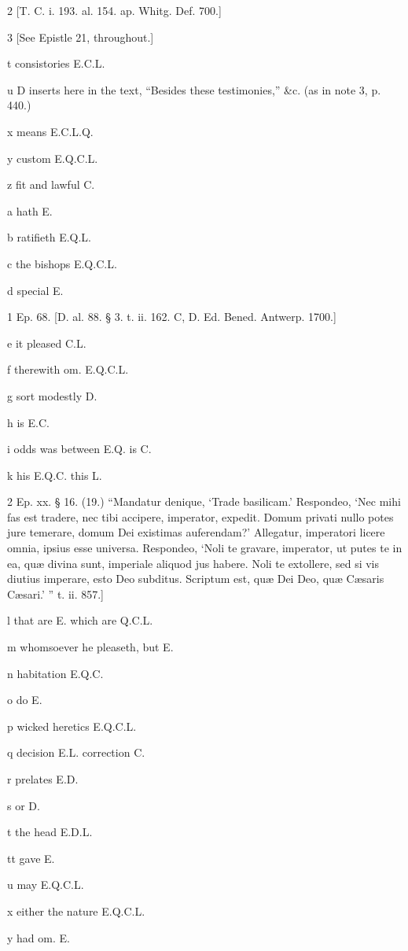 2
[T. C. i. 193. al. 154. ap. Whitg. Def. 700.]

3
[See Epistle 21, throughout.]

t
consistories E.C.L.

u
D inserts here in the text, “Besides these testimonies,” &c. (as in note 3, p. 440.)

x
means E.C.L.Q.

y
custom E.Q.C.L.

z
fit and lawful C.

a
hath E.

b
ratifieth E.Q.L.

c
the bishops E.Q.C.L.

d
special E.

1
Ep. 68. [D. al. 88. § 3. t. ii. 162. C, D. Ed. Bened. Antwerp. 1700.]

e
it pleased C.L.

f
therewith om. E.Q.C.L.

g
sort modestly D.

h
is E.C.

i
odds was between E.Q. is C.

k
his E.Q.C. this L.

2
Ep. xx. § 16. (19.) “Mandatur denique, ‘Trade basilicam.’ Respondeo, ‘Nec mihi fas est tradere, nec tibi accipere, imperator, expedit. Domum privati nullo potes jure temerare, domum Dei existimas auferendam?’ Allegatur, imperatori licere omnia, ipsius esse universa. Respondeo, ‘Noli te gravare, imperator, ut putes te in ea, quæ divina sunt, imperiale aliquod jus habere. Noli te extollere, sed si vis diutius imperare, esto Deo subditus. Scriptum est, quæ Dei Deo, quæ Cæsaris Cæsari.’ ” t. ii. 857.]

l
that are E. which are Q.C.L.

m
whomsoever he pleaseth, but E.

n
habitation E.Q.C.

o
do E.

p
wicked heretics E.Q.C.L.

q
decision E.L. correction C.

r
prelates E.D.

s
or D.

t
the head E.D.L.

tt
gave E.

u
may E.Q.C.L.

x
either the nature E.Q.C.L.

y
had om. E.


